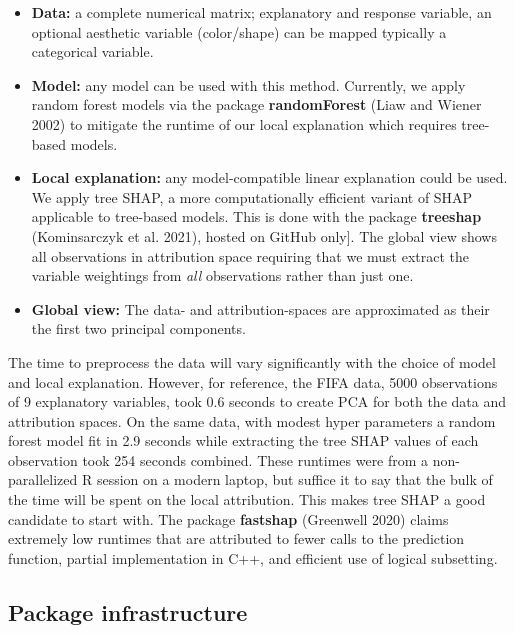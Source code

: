 \documentclass[
]{article}
\begin{document}
\begin{itemize}
    \item \textbf{Data:} a complete numerical matrix; explanatory and response variable, an optional aesthetic variable (color/shape)  can be mapped typically a categorical variable.
    \item \textbf{Model:} any model can be used with this method. Currently, we apply random forest models via the package \textbf{randomForest} (Liaw and Wiener 2002) to mitigate the runtime of our local explanation which requires tree-based models.
    \item \textbf{Local explanation:} any model-compatible linear explanation could be used. We apply tree SHAP, a more computationally efficient variant of SHAP applicable to tree-based models. This is done with the package \textbf{treeshap} (Kominsarczyk et al. 2021), hosted on GitHub only]. The global view shows all observations in attribution space requiring that we must extract the variable weightings from \emph{all} observations rather than just one.
    \item \textbf{Global view:} The data- and attribution-spaces are approximated as their the first two principal components.
\end{itemize}

The time to preprocess the data will vary significantly with the choice of model and local explanation. However, for reference, the FIFA data, 5000 observations of 9 explanatory variables, took 0.6 seconds to create PCA for both the data and attribution spaces. On the same data, with modest hyper parameters a random forest model fit in 2.9 seconds while extracting the tree SHAP values of each observation took 254 seconds combined. These runtimes were from a non-parallelized R session on a modern laptop, but suffice it to say that the bulk of the time will be spent on the local attribution. This makes tree SHAP a good candidate to start with. The package \textbf{fastshap} (Greenwell 2020) claims extremely low runtimes that are attributed to fewer calls to the prediction function, partial implementation in C++, and efficient use of logical subsetting.

\hypertarget{sec:infrastructure}{%
\subsection{Package infrastructure}\label{sec:infrastructure}}
\end{document}
